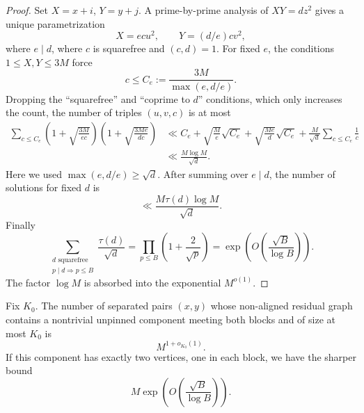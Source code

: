 \begin{proof}
Set $X=x+i$, $Y=y+j$. A prime-by-prime analysis of $XY=dz^2$ gives a unique parametrization
\[
 X=ecu^2,
 \qquad
 Y=(d/e)cv^2,
\]
where $e\mid d$, where $c$ is squarefree and $(c,d)=1$. For fixed $e$, the conditions $1\le X,Y\le3M$ force
\[
 c\le C_e:=\frac{3M}{\max(e,d/e)}.
\]
Dropping the ``squarefree'' and ``coprime to $d$'' conditions, which only increases the count, the number of triples $(u,v,c)$ is at most
\begin{align*}
 \sum_{c\le C_e}
 \left(1+\sqrt{\frac{3M}{ec}}\right)
 \left(1+\sqrt{\frac{3Me}{dc}}\right)
 &\ll
 C_e
 +\sqrt{\frac Me}\sqrt{C_e}
 +\sqrt{\frac{Me}d}\sqrt{C_e}
 +\frac M{\sqrt d}\sum_{c\le C_e}\frac1c\\
 &\ll
 \frac{M\log M}{\sqrt d}.
\end{align*}
Here we used $\max(e,d/e)\ge\sqrt d$. After summing over $e\mid d$, the number of solutions for fixed $d$ is
\[
 \ll\frac{M\tau(d)\log M}{\sqrt d}.
\]
Finally
\[
 \sum_{\substack{d\text{ squarefree}\\p\mid d\Rightarrow p\le B}}
 \frac{\tau(d)}{\sqrt d}
 =\prod_{p\le B}\left(1+\frac2{\sqrt p}\right)
 =\exp\!\left(O\!\left(\frac{\sqrt B}{\log B}\right)\right).
\]
The factor $\log M$ is absorbed into the exponential $M^{o(1)}$.
\end{proof}
\begin{lemma}\label{lem:bounded-component}
Fix $K_0$. The number of separated pairs $(x,y)$ whose non-aligned residual graph contains a nontrivial unpinned component meeting both blocks and of size at most $K_0$ is
\begin{equation}\label{eq:bounded-hosts}
 M^{1+o_{K_0}(1)}.
\end{equation}
If this component has exactly two vertices, one in each block, we have the sharper bound
\[
 M\exp\!\left(O\!\left(\frac{\sqrt B}{\log B}\right)\right).
\]
\end{lemma}

